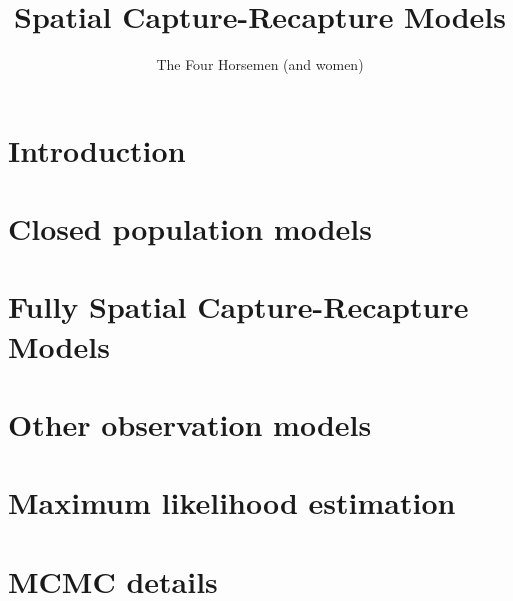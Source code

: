 \documentclass{book}
\begin{document}
\title{ Spatial Capture-Recapture Models }
\author{The Four Horsemen (and women) }


\maketitle

\newpage

\setcounter{tocdepth}{2}
\tableofcontents

\chapter{Introduction}
\label{chapt.intro}



\chapter{Closed population models}
\label{chapt.closed}



\chapter{Fully Spatial Capture-Recapture Models}
\label{chapt.scr0}



\chapter{Other observation models}
\label{chapt.poisson}

%

\chapter{Maximum likelihood estimation}
\label{chapt.mle}



\chapter{MCMC details}
\label{chapt.mcmc}
\end{document}
